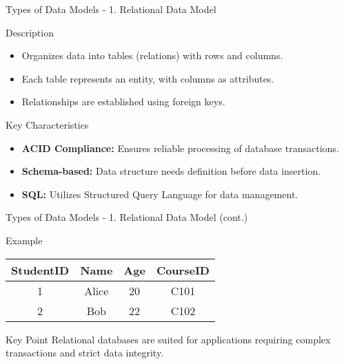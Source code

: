 \documentclass[aspectratio=169]{beamer}
\begin{document}
\begin{frame}[fragile]{Types of Data Models - 1. Relational Data Model}
    \begin{block}{Description}
        \begin{itemize}
            \item Organizes data into tables (relations) with rows and columns.
            \item Each table represents an entity, with columns as attributes.
            \item Relationships are established using foreign keys.
        \end{itemize}
    \end{block}

    \begin{block}{Key Characteristics}
        \begin{itemize}
            \item \textbf{ACID Compliance:} Ensures reliable processing of database transactions.
            \item \textbf{Schema-based:} Data structure needs definition before data insertion.
            \item \textbf{SQL:} Utilizes Structured Query Language for data management.
        \end{itemize}
    \end{block}
\end{frame}

\begin{frame}[fragile]{Types of Data Models - 1. Relational Data Model (cont.)}
    \begin{block}{Example}
        \begin{center}
            \begin{tabular}{|c|c|c|c|}
                \hline
                StudentID & Name   & Age & CourseID \\
                \hline
                1         & Alice  & 20  & C101     \\
                2         & Bob    & 22  & C102     \\
                \hline
            \end{tabular}
        \end{center}
    \end{block}

    \begin{block}{Key Point}
        Relational databases are suited for applications requiring complex transactions and strict data integrity.
    \end{block}
\end{frame}
\end{document}
